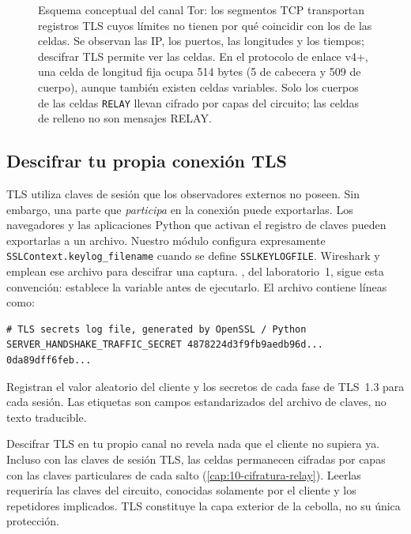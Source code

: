 \begin{figure}[htbp]
\centering

\caption{Esquema conceptual del canal Tor: los segmentos TCP transportan registros TLS cuyos límites no tienen por qué coincidir con los de las celdas. Se observan las IP, los puertos, las longitudes y los tiempos; descifrar TLS permite ver las celdas. En el protocolo de enlace v4+, una celda de longitud fija ocupa 514 bytes (5 de cabecera y 509 de cuerpo), aunque también existen celdas variables. Solo los cuerpos de las celdas \texttt{RELAY} llevan cifrado por capas del circuito; las celdas de relleno no son mensajes RELAY.}
\label{fig:incapsulamento}
\end{figure}

\subsection{Descifrar tu propia conexión TLS}

TLS utiliza claves de sesión que los observadores externos no poseen. Sin embargo, una parte que \emph{participa} en la conexión puede exportarlas. Los navegadores y las aplicaciones Python que activan el registro de claves pueden exportarlas a un archivo. Nuestro módulo  configura expresamente \texttt{SSLContext.keylog\_filename} cuando se define \texttt{SSLKEYLOGFILE}. Wireshark y  emplean ese archivo para descifrar una captura. , del laboratorio~1, sigue esta convención: establece la variable antes de ejecutarlo. El archivo contiene líneas como:
\begin{lstlisting}[numbers=none]
# TLS secrets log file, generated by OpenSSL / Python
SERVER_HANDSHAKE_TRAFFIC_SECRET 4878224d3f9fb9aedb96d... 0da89dff6feb...
\end{lstlisting}

Registran el valor aleatorio del cliente y los secretos de cada fase de TLS~1.3 para cada sesión. Las etiquetas son campos estandarizados del archivo de claves, no texto traducible.

\begin{approfondimento}
Descifrar TLS en tu propio canal no revela nada que el cliente no supiera ya. Incluso con las claves de sesión TLS, las celdas  permanecen cifradas por capas con las claves particulares de cada salto (\cref{cap:10-cifratura-relay}). Leerlas requeriría las claves del circuito, conocidas solamente por el cliente y los repetidores implicados. TLS constituye la capa exterior de la cebolla, no su única protección.
\end{approfondimento}

